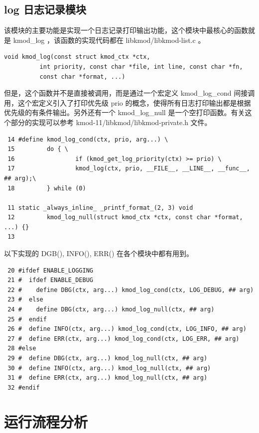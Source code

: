 \subsection{log 日志记录模块}

该模块的主要功能是实现一个日志记录打印输出功能，这个模块中最核心的函数就是
kmod\_log ，该函数的实现代码都在 libkmod/libkmod-list.c 。

{\begin{shaded}\begin{verbatim}
void kmod_log(const struct kmod_ctx *ctx,
          int priority, const char *file, int line, const char *fn,
          const char *format, ...)
\end{verbatim}\end{shaded}}
但是，这个函数并不是直接被调用，而是通过一个宏定义 kmod\_log\_cond
间接调用，这个宏定义引入了打印优先级 prio
的概念，使得所有日志打印输出都是根据优先级的有条件输出。另外还有一个
kmod\_log\_null 是一个空打印函数。有关这个部分的实现可以参考
kmod-11/libkmod/libkmod-private.h 文件。

{\begin{shaded}\begin{verbatim}
 14 #define kmod_log_cond(ctx, prio, arg...) \
 15         do { \
 16                 if (kmod_get_log_priority(ctx) >= prio) \
 17                 kmod_log(ctx, prio, __FILE__, __LINE__, __func__, ## arg);\
 18         } while (0)

 11 static _always_inline_ _printf_format_(2, 3) void
 12         kmod_log_null(struct kmod_ctx *ctx, const char *format, ...) {}
 13
\end{verbatim}\end{shaded}}
以下实现的 DGB(), INFO(), ERR() 在各个模块中都有用到。

{\begin{shaded}\begin{verbatim}
 20 #ifdef ENABLE_LOGGING
 21 #  ifdef ENABLE_DEBUG
 22 #    define DBG(ctx, arg...) kmod_log_cond(ctx, LOG_DEBUG, ## arg)
 23 #  else
 24 #    define DBG(ctx, arg...) kmod_log_null(ctx, ## arg)
 25 #  endif
 26 #  define INFO(ctx, arg...) kmod_log_cond(ctx, LOG_INFO, ## arg)
 27 #  define ERR(ctx, arg...) kmod_log_cond(ctx, LOG_ERR, ## arg)
 28 #else
 29 #  define DBG(ctx, arg...) kmod_log_null(ctx, ## arg)
 30 #  define INFO(ctx, arg...) kmod_log_null(ctx, ## arg)
 31 #  define ERR(ctx, arg...) kmod_log_null(ctx, ## arg)
 32 #endif
\end{verbatim}\end{shaded}}
\section{运行流程分析}

